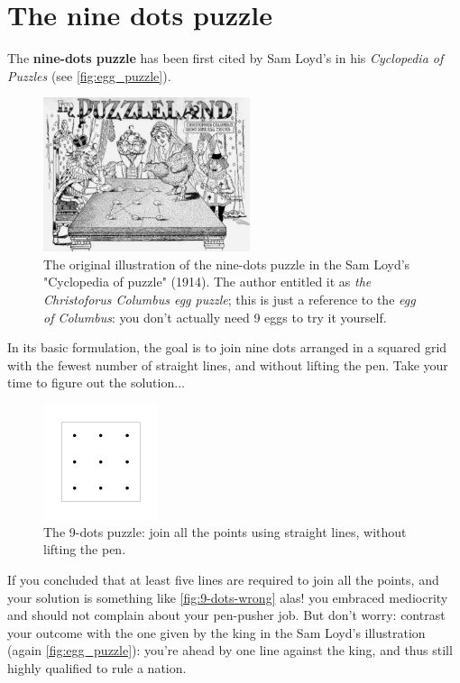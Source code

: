 \documentclass[11pt]{article}
\begin{document}
\newpage

\hypertarget{nine-dots-puzzle} {
	\section{The nine dots puzzle}
	\label{nine-dots-puzzle}
}
The \textbf{nine-dots puzzle} has been first cited by Sam Loyd's in his \emph{Cyclopedia of Puzzles} (see \autoref{fig:egg_puzzle}).
\begin{figure}[H]
	\centering
	\includegraphics[width=0.54\textwidth]{images/egg_puzzle.jpg}
	\caption{The original illustration of the nine-dots puzzle in the Sam Loyd's "Cyclopedia of puzzle" (1914). The author entitled it as \emph{the Christoforus Columbus egg puzzle}; this is just a reference to the \emph{egg of Columbus}: you don't actually need 9 eggs to try it yourself.}
\label{fig:egg_puzzle}
\end{figure}
In its basic formulation, the goal is to join nine dots arranged in a squared grid with the fewest number of straight lines, and without lifting the pen. Take your time to figure out the solution...
\begin{figure}[H]
\centering
\includegraphics[width=0.3\textwidth]{images/9-dots-grid.png}
\caption{The 9-dots puzzle: join all the points using straight lines, without lifting the pen.}
\label{fig:9-dots-grid}
\end{figure}
If you concluded that at least five lines are required to join all the points, and your solution is something like \autoref{fig:9-dots-wrong} alas! you embraced mediocrity and should not complain about your pen-pusher job. But don't worry: contrast your outcome with the one given by the king in the Sam Loyd's illustration (again \autoref{fig:egg_puzzle}): you're ahead by one line against the king, and thus still highly qualified to rule a nation.
\end{document}
